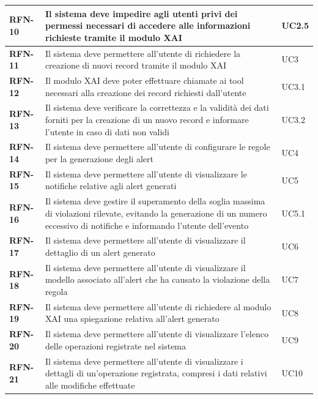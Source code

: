 \begin{longtable}{|l|p{}|l|}
        \hline
        \textbf{RFN-10} & Il sistema deve impedire agli utenti privi dei permessi necessari di accedere alle informazioni richieste tramite il modulo XAI & UC2.5  \\
        \hline
        \textbf{RFN-11} & Il sistema deve permettere all'utente di richiedere la creazione di nuovi record tramite il modulo XAI & UC3  \\
        \hline
        \textbf{RFN-12} & Il modulo XAI deve poter effettuare chiamate ai tool necessari alla creazione dei record richiesti dall'utente & UC3.1  \\
        \hline
        \textbf{RFN-13} & Il sistema deve verificare la correttezza e la validità dei dati forniti per la creazione di un nuovo record e informare l'utente in caso di dati non validi & UC3.2 \\
        \hline
        \textbf{RFN-14} & Il sistema deve permettere all'utente di configurare le regole per la generazione degli alert & UC4  \\
        \hline
        \textbf{RFN-15} & Il sistema deve permettere all'utente di visualizzare le notifiche relative agli alert generati & UC5  \\
        \hline
        \textbf{RFN-16} & Il sistema deve gestire il superamento della soglia massima di violazioni rilevate, evitando la generazione di un numero eccessivo di notifiche e informando l'utente dell'evento & UC5.1  \\
        \hline
        \textbf{RFN-17} & Il sistema deve permettere all'utente di visualizzare il dettaglio di un alert generato & UC6  \\
        \hline
        \textbf{RFN-18} & Il sistema deve permettere all'utente di visualizzare il modello associato all'alert che ha causato la violazione della regola & UC7  \\
        \hline
        \textbf{RFN-19} & Il sistema deve permettere all'utente di richiedere al modulo XAI una spiegazione relativa all'alert generato & UC8 \\
        \hline
        \textbf{RFN-20} & Il sistema deve permettere all'utente di visualizzare l'elenco delle operazioni registrate nel sistema & UC9 \\
        \hline
        \textbf{RFN-21} & Il sistema deve permettere all'utente di visualizzare i dettagli di un'operazione registrata, compresi i dati relativi alle modifiche effettuate & UC10\\
        \hline
    \end{longtable}

